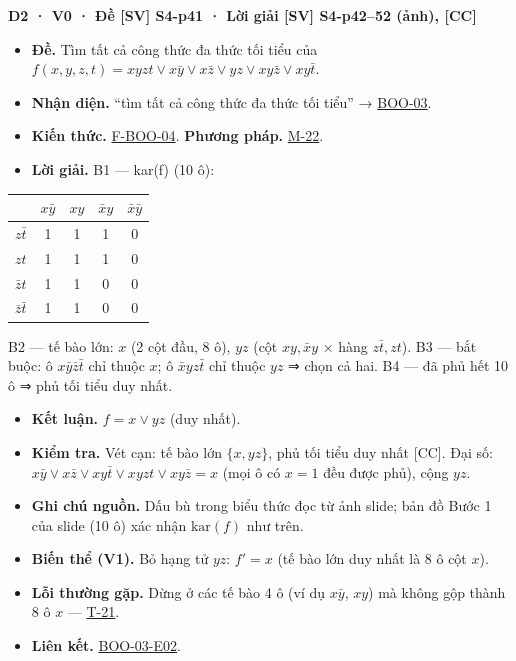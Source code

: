 \documentclass[
  10pt,
  twoside,openany]{book}
\providecommand{\tightlist}{%
  \setlength{\itemsep}{0pt}\setlength{\parskip}{0pt}}
\begin{document}
\textbf{D2 · V0 · Đề {[}SV{]} S4-p41 · Lời giải {[}SV{]} S4-p42--52
(ảnh), {[}CC{]}}

\begin{itemize}
\tightlist
\item
  \textbf{Đề.} Tìm tất cả công thức đa thức tối tiểu của
  \(f(x,y,z,t)=xyzt\vee x\bar y\vee x\bar z\vee yz\vee xy\bar z\vee xy\bar t\).
\item
  \textbf{Nhận diện.} ``tìm tất cả công thức đa thức tối tiểu'' →
  \protect\hyperlink{BOO-03}{BOO-03}.
\item
  \textbf{Kiến thức.} \protect\hyperlink{F-BOO-04}{F-BOO-04}.
  \textbf{Phương pháp.} \protect\hyperlink{M-22}{M-22}.
\item
  \textbf{Lời giải.} B1 --- kar(f) (10 ô):
\end{itemize}

\begin{longtable}[]{@{}lcccc@{}}
\toprule\noalign{}
& \(x\bar y\) & \(xy\) & \(\bar xy\) & \(\bar x\bar y\) \\
\midrule\noalign{}
\endhead
\bottomrule\noalign{}
\endlastfoot
\(z\bar t\) & 1 & 1 & 1 & 0 \\
\(zt\) & 1 & 1 & 1 & 0 \\
\(\bar zt\) & 1 & 1 & 0 & 0 \\
\(\bar z\bar t\) & 1 & 1 & 0 & 0 \\
\end{longtable}

B2 --- tế bào lớn: \(x\) (2 cột đầu, 8 ô), \(yz\) (cột \(xy,\bar xy\) ×
hàng \(z\bar t,zt\)). B3 --- bắt buộc: ô \(x\bar y\bar z\bar t\) chỉ
thuộc \(x\); ô \(\bar xyz\bar t\) chỉ thuộc \(yz\) ⇒ chọn cả hai. B4 ---
đã phủ hết 10 ô ⇒ phủ tối tiểu duy nhất.

\begin{itemize}
\tightlist
\item
  \textbf{Kết luận.} \(f=x\vee yz\) (duy nhất).
\item
  \textbf{Kiểm tra.} Vét cạn: tế bào lớn \(\{x, yz\}\), phủ tối tiểu duy
  nhất {[}CC{]}. Đại số:
  \(x\bar y\vee x\bar z\vee xy\bar t\vee xyzt\vee xy\bar z=x\) (mọi ô có
  \(x=1\) đều được phủ), cộng \(yz\).
\item
  \textbf{Ghi chú nguồn.} Dấu bù trong biểu thức đọc từ ảnh slide; bản
  đồ Bước 1 của slide (10 ô) xác nhận \(\mathrm{kar}(f)\) như trên.
\item
  \textbf{Biến thể (V1).} Bỏ hạng tử \(yz\): \(f'=x\) (tế bào lớn duy
  nhất là 8 ô cột \(x\)).
\item
  \textbf{Lỗi thường gặp.} Dừng ở các tế bào 4 ô (ví dụ \(x\bar y\),
  \(xy\)) mà không gộp thành 8 ô \(x\) ---
  \protect\hyperlink{T-21}{T-21}.
\item
  \textbf{Liên kết.} \protect\hyperlink{BOO-03-E02}{BOO-03-E02}.
\end{itemize}
\end{document}
